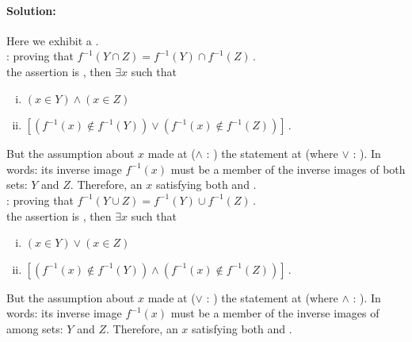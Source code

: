 \paragraph{Solution:}{
Here we exhibit a .\\

 : proving that $f^{-1}(Y \cap Z) = f^{-1}(Y) \cap f^{-1}(Z)\,.$\\
 the assertion is , then $\exists x$ such that
\begin{enumerate}[i)]
\item $(x \in Y) \land (x \in Z)$ 
\item $\left[ \left( f^{-1}(x) \notin f^{-1}(Y) \right) \lor \left( f^{-1}(x) \notin f^{-1}(Z) \right) \right]\,.$
\end{enumerate}
But the assumption about $x$ made at  ($\land$ : )  the statement at 
(where $\lor$ : ). In words:  its inverse image $f^{-1}(x)$ must be a member of the inverse images of both sets: $Y$ and $Z$. Therefore, an $x$ satisfying both  and  .\\ 

 : proving that $f^{-1}(Y \cup Z) = f^{-1}(Y) \cup f^{-1}(Z)\,.$\\
 the assertion is , then $\exists x$ such that
\begin{enumerate}[i)]
\item $(x \in Y) \lor (x \in Z)$ 
\item $\left[ \left( f^{-1}(x) \notin f^{-1}(Y) \right) \land \left( f^{-1}(x) \notin f^{-1}(Z) \right) \right]\,.$
\end{enumerate}
But the assumption about $x$ made at  ($\lor$ : )  the statement at 
(where $\land$ : ). In words:  its inverse image $f^{-1}(x)$ must be a member of the inverse images of  among sets: $Y$ and $Z$. Therefore, an $x$ satisfying both  and  .\\ 
}	%

